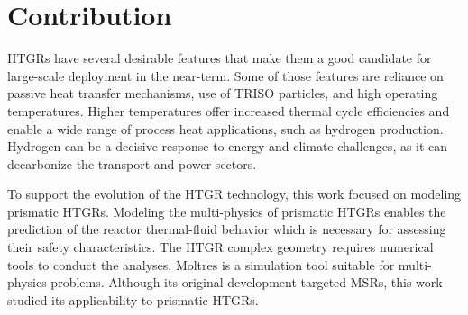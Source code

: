\section{Contribution}

HTGRs have several desirable features that make them a good candidate for large-scale deployment in the near-term.
Some of those features are reliance on passive heat transfer mechanisms, use of TRISO particles, and high operating temperatures.
Higher temperatures offer increased thermal cycle efficiencies and enable a wide range of process heat applications, such as hydrogen production.
Hydrogen can be a decisive response to energy and climate challenges, as it can decarbonize the transport and power sectors.

To support the evolution of the HTGR technology, this work focused on modeling prismatic HTGRs.
Modeling the multi-physics of prismatic HTGRs enables the prediction of the reactor thermal-fluid behavior which is necessary for assessing their safety characteristics.
The HTGR complex geometry requires numerical tools to conduct the analyses.
Moltres is a simulation tool suitable for multi-physics problems.
Although its original development targeted MSRs, this work studied its applicability to prismatic HTGRs.


